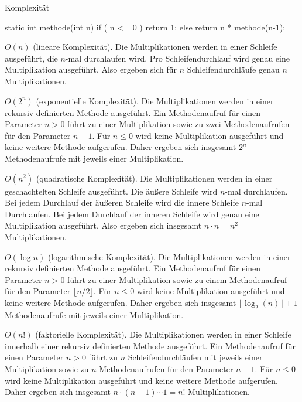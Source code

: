 \begin{exercise}{Komplexität}
\begin{body}
\begin{parts}
\item
\begin{displaycode}
    static int methode(int n) {
        if ( n <= 0 ) {
            return 1;
        } else {
            return n * methode(n-1);
        } 
    }
\end{displaycode}
\end{parts}
\end{body}


\begin{solution}
\begin{parts}
\item
$O(n)$ (lineare Komplexität). Die Multiplikationen werden in einer Schleife ausgeführt, die $n$-mal durchlaufen wird. Pro Schleifendurchlauf wird genau eine Multiplikation ausgeführt. Also ergeben sich für $n$ Schleifendurchläufe genau $n$ Multiplikationen. 

\item
$O(2^n)$ (exponentielle Komplexität). Die Multiplikationen werden in einer rekursiv definierten Methode ausgeführt. Ein Methodenaufruf für einen Parameter $n > 0$ führt zu einer Multiplikation sowie zu zwei Methodenaufrufen für den Parameter $n-1$.
Für $n \leq 0$ wird keine Multiplikation ausgeführt und keine weitere Methode aufgerufen. Daher ergeben sich insgesamt $2^{n}$ Methodenaufrufe mit jeweils einer Multiplikation.


\item
$O(n^2)$ (quadratische Komplexität). Die Multiplikationen werden in einer geschachtelten Schleife ausgeführt.
Die äußere Schleife wird $n$-mal durchlaufen. Bei jedem Durchlauf der äußeren Schleife wird die innere Schleife $n$-mal Durchlaufen. Bei jedem Durchlauf der inneren Schleife wird genau eine Multiplikation ausgeführt. Also ergeben sich insgesamt $n\cdot n = n^2$ Multiplikationen.

\item
$O(\log n)$ (logarithmische Komplexität). Die Multiplikationen werden in einer rekursiv definierten Methode ausgeführt. Ein Methodenaufruf für einen Parameter $n > 0$ führt zu einer Multiplikation sowie zu einem Methodenaufruf für den Parameter $\lfloor n/2\rfloor$. Für $n \leq 0$ wird keine Multiplikation ausgeführt und keine weitere Methode aufgerufen. Daher ergeben sich insgesamt $\lfloor\log_2(n)\rfloor + 1$ Methodenaufrufe mit jeweils einer Multiplikation. 

\item
$O(n!)$ (faktorielle Komplexität). Die Multiplikationen werden in einer Schleife innerhalb einer rekursiv definierten Methode ausgeführt. Ein Methodenaufruf für einen Parameter $n > 0$ führt zu $n$ Schleifendurchläufen mit jeweils einer Multiplikation sowie zu $n$ Methodenaufrufen für den Parameter $n-1$. Für $n \leq 0$ wird keine Multiplikation ausgeführt und keine weitere Methode aufgerufen. Daher ergeben sich insgesamt $n \cdot (n-1) \dotsm 1 = n!$ Multiplikationen.


\end{parts}
\end{solution}
\end{exercise}
